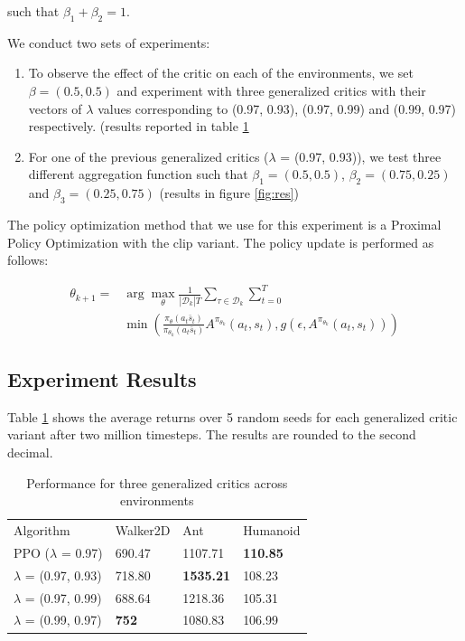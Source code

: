 such that $\beta_1 + \beta_2 = 1$.

We conduct two sets of experiments: 
\begin{enumerate}
\item To observe the effect of the critic on each of the environments, we set $\beta=(0.5, 0.5)$ and experiment with three generalized critics with their vectors of $\lambda$ values corresponding to (0.97, 0.93), (0.97, 0.99) and (0.99, 0.97) respectively. (results reported in table \ref{tab:reslam}
\item For one of the previous generalized critics ($\lambda$ = (0.97, 0.93)), we test three different aggregation function such that $\beta_1 = (0.5, 0.5)$, $\beta_2 = (0.75, 0.25)$ and $\beta_3 = (0.25, 0.75)$ (results in figure \ref{fig:res})
\end{enumerate}

The policy optimization method that we use for this experiment is a Proximal Policy Optimization\cite{schulman2017proximal} with the clip variant. The policy update is performed as follows:

\begin{align*}
\theta_{k+1} = & \arg \max_{\theta} \frac{1}{| \mathcal{D}_k | T} \sum_{\tau \in \mathcal{D}_k} \sum_{t=0}^T \\ 
& \min \left(\frac{\pi_{\theta}(a_t\bar s_t)}{\pi_{\theta_k}(a_t\bar s_t)} A^{\pi_{\theta_k}}(a_t, s_t), g(\epsilon, A^{\pi_{\theta_k}}(a_t, s_t))\right)
\end{align*}

\subsection{Experiment Results}

Table \ref{tab:reslam} shows the average returns over 5 random seeds for each generalized critic variant after two million timesteps. The results are rounded to the second decimal.

\begin{table}[!htb]
\begin{tabular}{p{22mm}p{14mm}p{15mm}p{11mm}}
Algorithm & Walker2D & Ant & Humanoid \\
PPO ($\lambda$ = 0.97) & 690.47 & 1107.71 & \textbf{110.85} \\
\hline
$\lambda$ = (0.97, 0.93) & 718.80 & \textbf{1535.21} & 108.23  \\ 
\hline
$\lambda$ = (0.97, 0.99)& 688.64 & 1218.36 & 105.31  \\ 
\hline
$\lambda$ = (0.99, 0.97)& \textbf{752} & 1080.83 & 106.99 \\ 
\end{tabular}
\caption{Performance for three generalized critics across environments}
\label{tab:reslam}
\end{table}

